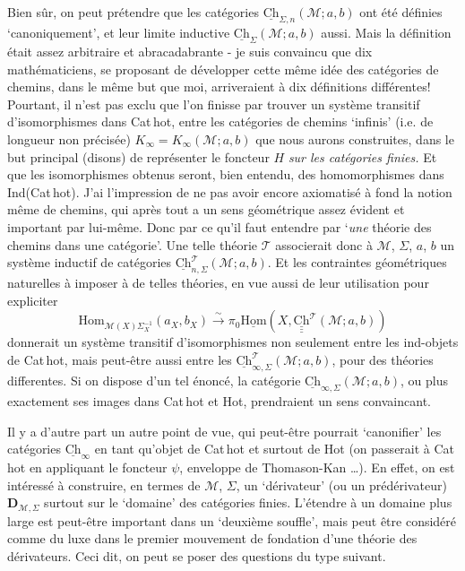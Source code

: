 \documentclass[11pt]{article}
\newcommand{\msp}[1]{\marginpar{\footnotesize [#1]}}
\newcommand{\uHom}{\underline{\mathrm{Hom}}}
\newcommand{\Hom}{\mathrm{Hom}}
\newcommand{\uCh}{\underline{\mathrm{Ch}}}
\newcommand{\Ch}{\underline{\mathrm{Ch}}}
\begin{document}
Bien sûr, on peut prétendre que les catégories $\uCh_{\Sigma,n}(\mathcal{M}; a, b)$ ont été définies `canoniquement', et leur limite inductive $\uCh_{\Sigma}(\mathcal{M}; a, b)$ aussi. Mais la définition était assez arbitraire et abracadabrante - je suis convaincu que dix mathématiciens, se proposant de développer cette même idée des catégories de chemins, dans le même but que moi, arriveraient à dix définitions différentes! Pourtant, il n'est pas exclu que l'on finisse par trouver un système transitif d'isomorphismes dans Cat\,hot, entre les catégories de chemins `infinis' (i.e. de longueur non précisée) $K_\infty = K_\infty(\mathcal{M}; a, b)$ que nous aurons construites, dans le but
\msp{page 50}
principal (disons) de représenter le foncteur $H$ \textit{sur les catégories finies.} Et que les isomorphismes obtenus seront, bien entendu, des homomorphismes dans Ind(Cat\,hot). J'ai l'impression de ne pas avoir encore axiomatisé à fond la notion même de chemins, qui après tout a un sens géométrique assez évident et important par lui-même. Donc par ce qu'il faut entendre par `\textit{une} théorie des chemins dans une catégorie'. Une telle théorie $\mathcal{T}$ associerait donc à $\mathcal{M}$, $\Sigma$, $a$, $b$ un système inductif de catégories $\Ch^{\mathcal{T}}_{n,\Sigma}(\mathcal{M}; a, b)$. Et les contraintes géométriques naturelles à imposer à de telles théories, en vue aussi de leur utilisation pour expliciter
\[
\Hom_{\mathcal{M}(X)\Sigma_X^{-1}}(a_X, b_X) \xrightarrow{\ \sim\ } \pi_0\uHom(X, \underline{\underline{\underline{\mathrm{Ch}}}}^{\mathcal{T}}(\mathcal{M}; a, b)) %
\]
donnerait un système transitif d'isomorphismes non seulement entre les ind-objets de Cat\,hot, mais peut-être aussi entre les $\Ch^{\mathcal{T}}_{\infty,\Sigma}(\mathcal{M}; a, b)$, pour des théories differentes. Si on dispose d'un tel énoncé, la catégorie $\Ch_{\infty,\Sigma}(\mathcal{M}; a, b)$, ou plus exactement ses images dans Cat\,hot et Hot, %
\msp{page 51}
prendraient un sens convaincant.

Il y a d'autre part un autre point de vue, qui peut-être pourrait `canonifier' les catégories $\uCh_\infty$ en tant qu'objet de Cat\,hot et surtout de Hot (on passerait à Cat\,hot en appliquant le foncteur $\psi$, enveloppe de Thomason-Kan \ldots). En effet, on est intéressé à construire, en termes de $\mathcal{M}$, $\Sigma$, un `dérivateur' (ou un prédérivateur) $\mathbf{D}_{\mathcal{M},\Sigma}$ surtout sur le `domaine' des catégories finies. L'étendre à un domaine plus large est peut-être important dans un `deuxième souffle', mais peut être considéré comme du luxe dans le premier mouvement de fondation d'une théorie des dérivateurs. Ceci dit, on peut se poser des questions du type suivant.
\end{document}
